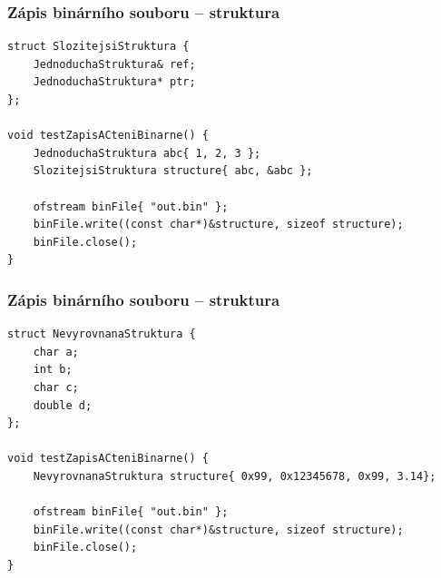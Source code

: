 \begin{frame}[fragile]
\frametitle{Zápis binárního souboru -- struktura}
\begin{yesblock}
\begin{lstlisting}
struct SlozitejsiStruktura {
	JednoduchaStruktura& ref;
	JednoduchaStruktura* ptr;
};

void testZapisACteniBinarne() {
	JednoduchaStruktura abc{ 1, 2, 3 };
	SlozitejsiStruktura structure{ abc, &abc };

	ofstream binFile{ "out.bin" };
	binFile.write((const char*)&structure, sizeof structure);
	binFile.close();
}
\end{lstlisting}
\end{yesblock}
\end{frame}











\begin{frame}[fragile]
\frametitle{Zápis binárního souboru -- struktura}
\begin{yesblock}
\begin{lstlisting}
struct NevyrovnanaStruktura {
	char a;
	int b;
	char c;
	double d;
};

void testZapisACteniBinarne() {
	NevyrovnanaStruktura structure{ 0x99, 0x12345678, 0x99, 3.14};

	ofstream binFile{ "out.bin" };
	binFile.write((const char*)&structure, sizeof structure);
	binFile.close();
}
\end{lstlisting}
\end{yesblock}
\end{frame}


